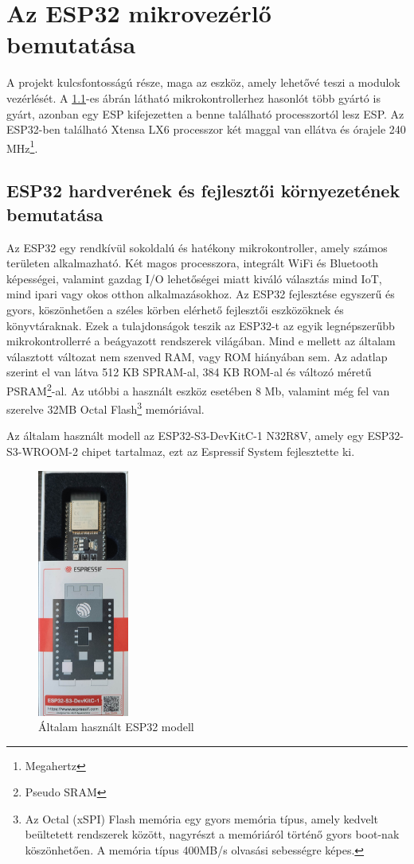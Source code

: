 \documentclass{thesis-ekf}
\theoremstyle{definition}
\theoremstyle{remark}
\begin{document}
	\chapter{Az ESP32 mikrovezérlő bemutatása}
	\label{ch_esp}
	A projekt kulcsfontosságú része, maga az eszköz, amely lehetővé teszi a modulok vezérlését. A \ref{img_myesp}-es ábrán látható mikrokontrollerhez hasonlót több gyártó is gyárt, azonban egy ESP kifejezetten a benne található processzortól lesz ESP. Az ESP32-ben található Xtensa LX6 processzor két maggal van ellátva és órajele 240 MHz\footnote{Megahertz}.
	\section{ESP32 hardverének és fejlesztői környezetének bemutatása}
	\label{se_espB}
	Az ESP32 egy rendkívül sokoldalú és hatékony mikrokontroller, amely számos területen alkalmazható. Két magos processzora, integrált WiFi és Bluetooth képességei, valamint gazdag I/O lehetőségei miatt kiváló választás mind IoT, mind ipari vagy okos otthon alkalmazásokhoz. Az ESP32 fejlesztése egyszerű és gyors, köszönhetően a széles körben elérhető fejlesztői eszközöknek és könyvtáraknak. Ezek a tulajdonságok teszik az ESP32-t az egyik legnépszerűbb mikrokontrollerré a beágyazott rendszerek világában. Mind e mellett az általam választott változat nem szenved RAM, vagy ROM hiányában sem. Az adatlap szerint el van látva 512 KB SPRAM-al, 384 KB ROM-al és változó méretű PSRAM\footnote{Pseudo SRAM}-al. Az utóbbi a használt eszköz esetében 8 Mb, valamint még fel van szerelve 32MB Octal Flash\footnote{Az Octal (xSPI) Flash memória egy gyors memória típus, amely kedvelt beültetett rendszerek között, nagyrészt a memóriáról történő gyors boot-nak köszönhetően. A memória típus 400MB/s olvasási sebességre képes.\cite{bib_esp_octal}} memóriával.
	
	
	Az általam  használt modell az ESP32-S3-DevKitC-1 N32R8V, amely egy ESP32-S3-WROOM-2 chipet tartalmaz, ezt az Espressif System fejlesztette ki.
	\begin{figure}[!ht]
		\centering
		\includegraphics[width=3cm]{MyESP32}
		\caption{Általam használt ESP32 modell}
		\label{img_myesp}
	\end{figure}
	
\end{document}
